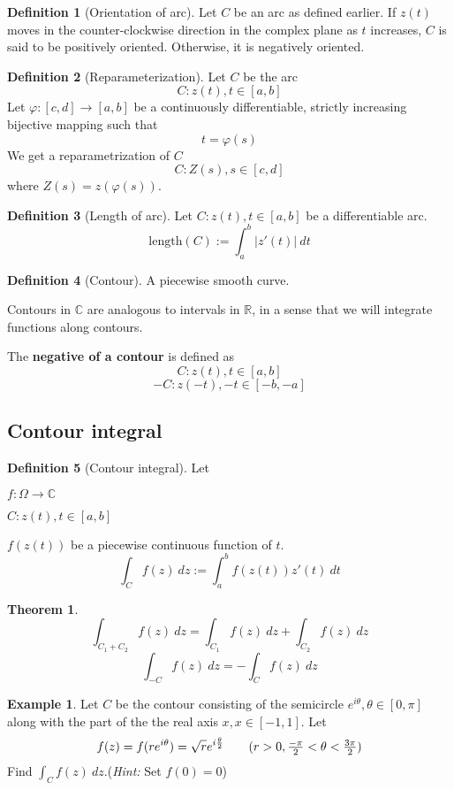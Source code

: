 \documentclass[10pt, a4paper]{extarticle}
\theoremstyle{definition}
\newtheorem{thm}{Theorem}
\newtheorem{defn}{Definition}
\newtheorem{eg}{Example}
\begin{document}
	\begin{defn}[Orientation of arc]
		Let $C$ be an arc as defined earlier. If $z(t)$ moves in the counter-clockwise direction in the complex plane as $t$ increases, $C$ is said to be positively oriented. Otherwise, it is negatively oriented.
	\end{defn}

	\begin{defn}[Reparameterization]
		Let $C$ be the arc
		\[C:z(t), t\in[a,b]\] Let $\varphi:[c,d]\to [a,b]$ be a continuously differentiable, strictly increasing bijective mapping such that \[t=\varphi(s)\]
		We get a reparametrization of $C$
		\[C:Z(s), s\in[c,d]\]
		where $Z(s)=z(\varphi(s))$.
	\end{defn}

	\begin{defn}[Length of arc]
		Let $C:z(t),t\in[a,b]$ be a differentiable arc.
		\[\text{length}(C):=\int_a^b|z'(t)|\ dt\]
	\end{defn}

	\begin{defn}[Contour]
		A piecewise smooth curve.

		Contours in $\mathbb{C}$ are analogous to intervals in $\mathbb{R}$, in a sense that we will integrate functions along contours.
		
		The \textbf{negative of a contour} is defined as
		\[C:z(t),t\in[a,b]\]
		\[-C:z(-t),-t\in[-b,-a]\]
	\end{defn}

	\subsection{Contour integral}
	\begin{defn}[Contour integral]
		Let

		$f:\Omega\to\mathbb{C}$

		$C:z(t),t\in[a,b]$

		$f(z(t))$ be a piecewise continuous function of $t$.
		\[\int_Cf(z)\ dz:=\int_a^bf(z(t))z'(t)\ dt\]
	\end{defn}
	\begin{thm}
		\[\int_{C_1+C_2}f(z)\ dz=\int_{C_1}f(z)\ dz+\int_{C_2}f(z)\ dz\]
		\[\int_{-C}f(z)\ dz=-\int_C f(z)\ dz\]
	\end{thm}
	\begin{eg}
		Let $C$ be the contour consisting of the semicircle $e^{i\theta},\theta\in[0,\pi]$ along with the part of the the real axis $x, x\in[-1,1]$. Let
		\[f(z)=f(re^{i\theta})=\sqrt{r}e^{i\frac{\theta}{2}}\tag*{($r>0, \frac{-\pi}{2}<\theta<\frac{3\pi}{2}$)}\]
		Find $\int_C f(z)\ dz$.(\textit{Hint:} Set $f(0)=0$)
	\end{eg}
\end{document}

